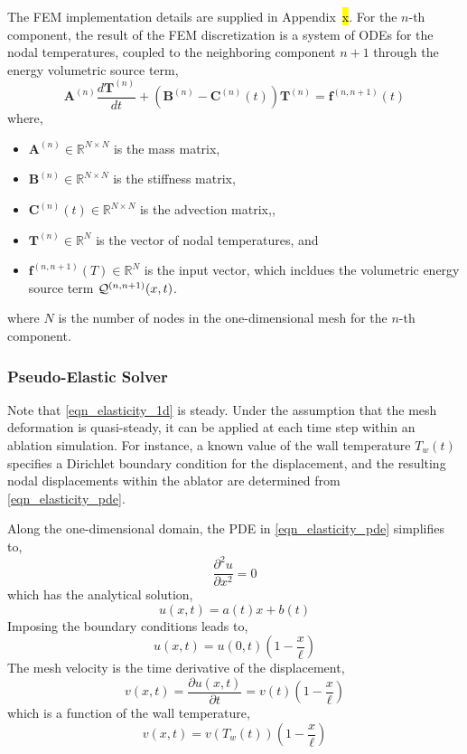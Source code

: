 The FEM implementation details are supplied in Appendix~\hl{x}. For the $n$-th component, the result of the FEM discretization is a system of ODEs for the nodal temperatures, coupled to the neighboring component $n+1$ through the energy volumetric source term,
\begin{equation}
    \mathbf{A}^{(n)}\frac{d\mathbf{T}^{(n)}}{dt} + \left(\mathbf{B}^{(n)} - \mathbf{C}^{(n)}(t)\right)\mathbf{T}^{(n)} = \mathbf{f}^{(n,n+1)}(t)
\end{equation}
where,
\begin{itemize}
    \item $\mathbf{A}^{(n)}\in\mathbb{R}^{N\times N}$ is the mass matrix,
    \item $\mathbf{B}^{(n)}\in\mathbb{R}^{N\times N}$ is the stiffness matrix,
    \item $\mathbf{C}^{(n)}(t)\in\mathbb{R}^{N\times N}$ is the advection matrix,,
    \item $\mathbf{T}^{(n)}\in\mathbb{R}^{N}$ is the vector of nodal temperatures, and
    \item $\mathbf{f}^{(n,n+1)}(T)\in\mathbb{R}^{N}$ is the input vector, which incldues the volumetric energy source term $\mathcal{Q}^{(n,n+1)}(x,t)$.
\end{itemize}
where $N$ is the number of nodes in the one-dimensional mesh for the $n$-th component.

\subsubsection{Pseudo-Elastic Solver}

Note that \cref{eqn_elasticity_1d} is steady. Under the assumption that the mesh deformation is quasi-steady, it can be applied at each time step within an ablation simulation. For instance, a known value of the wall temperature $T_w(t)$ specifies a Dirichlet boundary condition for the displacement, and the resulting nodal displacements within the ablator are determined from \cref{eqn_elasticity_pde}.

Along the one-dimensional domain, the PDE in \cref{eqn_elasticity_pde} simplifies to,
\begin{equation}
    \frac{\partial^2 u}{\partial x^2} = 0
\end{equation}
which has the analytical solution,
\begin{equation}
    u(x,t) = a(t)x + b(t)
\end{equation}
Imposing the boundary conditions leads to,
\begin{equation}
    u(x,t) = u(0,t)\left(1 - \frac{x}{\ell}\right)
\end{equation}
The mesh velocity is the time derivative of the displacement,
\begin{equation}
    v(x,t) = \frac{\partial u(x,t)}{\partial t} = v(t)\left(1 - \frac{x}{\ell}\right)
\end{equation}
which is a function of the wall temperature,
\begin{equation}
    v(x,t) = v(T_w(t)) \left(1 - \frac{x}{\ell}\right)
\end{equation}

